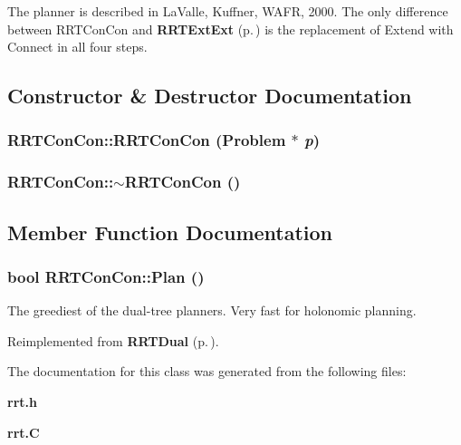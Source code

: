 The planner is described in La\-Valle, Kuffner, WAFR, 2000. The only difference between RRTCon\-Con and {\bf RRTExt\-Ext} {\rm (p.\,\pageref{classRRTExtExt})} is the replacement of Extend with Connect in all four steps. 



\subsection{Constructor \& Destructor Documentation}
\subsubsection{\setlength{\rightskip}{0pt plus 5cm}RRTCon\-Con::RRTCon\-Con ({\bf Problem} $\ast$ {\em p})}\label{classRRTConCon_a0}


\subsubsection{\setlength{\rightskip}{0pt plus 5cm}RRTCon\-Con::$\sim$RRTCon\-Con ()\hspace{0.3cm}{\tt  [inline, virtual]}}\label{classRRTConCon_a1}




\subsection{Member Function Documentation}
\subsubsection{\setlength{\rightskip}{0pt plus 5cm}bool RRTCon\-Con::Plan ()\hspace{0.3cm}{\tt  [virtual]}}\label{classRRTConCon_a2}


The greediest of the dual-tree planners. Very fast for holonomic planning.



Reimplemented from {\bf RRTDual} {\rm (p.\,\pageref{classRRTDual_a2})}.

The documentation for this class was generated from the following files:\begin{CompactItemize}
\item 
{\bf rrt.h}\item 
{\bf rrt.C}\end{CompactItemize}
